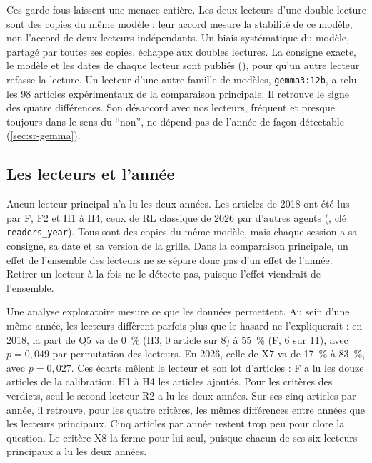 Ces garde-fous laissent une menace entière. Les deux lecteurs d'une double lecture sont des copies
du même modèle : leur accord mesure la stabilité de ce modèle, non l'accord de deux lecteurs
indépendants. Un biais systématique du modèle, partagé par toutes ses copies, échappe aux doubles
lectures. La consigne exacte, le modèle et les dates de chaque lecteur sont publiés
(), pour qu'un autre lecteur refasse la lecture. Un lecteur d'une autre famille
de modèles, \texttt{gemma3:12b}, a relu les 98 articles expérimentaux de la comparaison principale.
Il retrouve le signe des quatre différences. Son désaccord avec nos lecteurs,
fréquent et presque toujours dans le sens du \enquote{non}, ne dépend pas de l'année de façon
détectable (\cref{sec:sr-gemma}).

\subsection{Les lecteurs et l'année}

Aucun lecteur principal n'a lu les deux années. Les articles de 2018 ont été lus par F, F2 et H1 à
H4, ceux de RL classique de 2026 par d'autres agents (, clé
\texttt{readers\_year}). Tous sont des copies du même modèle, mais chaque session a sa consigne, sa
date et sa version de la grille. Dans la comparaison principale, un effet de l'ensemble des lecteurs
ne se sépare donc pas d'un effet de l'année. Retirer un lecteur à la fois ne le détecte
pas, puisque l'effet viendrait de l'ensemble.

Une analyse exploratoire mesure ce que les données permettent. Au sein d'une même année, les lecteurs
diffèrent parfois plus que le hasard ne l'expliquerait : en 2018, la part de Q5 va de 0~\% (H3, 0
article sur 8) à 55~\% (F, 6 sur 11), avec $p = 0{,}049$ par permutation des lecteurs. En 2026, celle de X7 va de 17~\% à 83~\%, avec $p = 0{,}027$. Ces écarts mêlent le lecteur et son lot d'articles :
F a lu les douze articles de la calibration, H1 à H4 les articles ajoutés. Pour les critères des
verdicts, seul le second lecteur R2 a lu les deux années. Sur ses cinq articles par année, il retrouve, pour les quatre critères, les mêmes différences entre années que les lecteurs principaux. Cinq articles par année restent trop peu
pour clore la question. Le critère X8 la ferme pour lui seul, puisque chacun de ses six lecteurs
principaux a lu les deux années.

